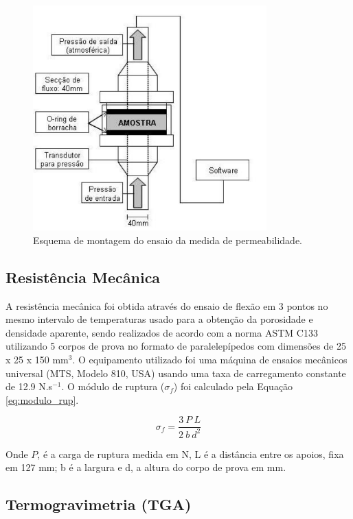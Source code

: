 \begin{figure}[ht]
	\centering
	\includegraphics[width=9cm]{./figures/perm.pdf}
	\caption{Esquema de montagem do ensaio da medida de
    permeabilidade. \label{fig:perm}}
\end{figure}

   

\subsection{Resistência Mecânica}\label{mat:rm}
A resistência mecânica foi obtida através do ensaio de flexão em 3 pontos no
mesmo intervalo de temperaturas usado para a obtenção da porosidade e densidade
aparente, sendo realizados de acordo com a norma ASTM C133 utilizando 5 corpos
de prova no formato de paralelepípedos com dimensões de 25 x 25 x 150 mm$^3$. O
equipamento utilizado foi uma máquina de ensaios mecânicos universal (MTS,
Modelo 810, USA) usando uma taxa de carregamento constante de 12.9 N.s$^{-1}$. O
módulo de ruptura ($\sigma_f$) foi calculado pela Equação \ref{eq:modulo_rup}.

\begin{equation}
  \label{eq:modulo_rup}
  \sigma_f = \frac{3 \ P \ L}{2 \ b \ d^2}
\end{equation}

Onde $P$, é a carga de ruptura medida em N, L é a distância entre os apoios,
fixa em 127 mm; b é a largura e d, a altura do corpo de prova em mm.
    
\subsection{Termogravimetria (TGA)}\label{mat:TGA}

